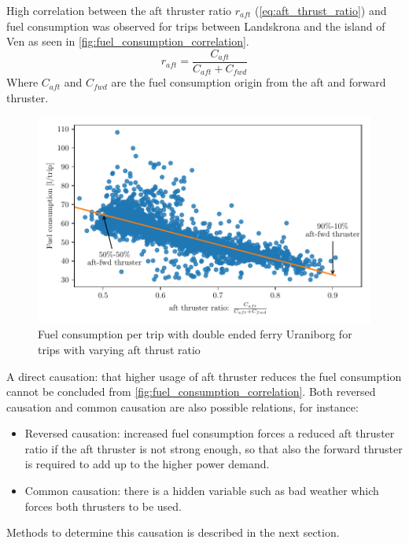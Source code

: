 \documentclass[fleqn,10pt]{olplainarticle}
\begin{document}
\newpage 
\noindent High correlation between the aft thruster ratio $r_{aft}$ (\autoref{eq:aft_thrust_ratio}) and fuel consumption 
was observed for trips between Landskrona and the island of Ven as seen in \autoref{fig:fuel_consumption_correlation}.
\begin{equation}
    r_{aft} = \frac{C_{aft}}{C_{aft} + C_{fwd}}
    \label{eq:aft_thrust_ratio}
\end{equation}
Where $C_{aft}$ and $C_{fwd}$ are the fuel consumption origin from the aft and forward thruster.
\begin{figure}[!htb]
    \centering
    \includegraphics[width=\textwidth]{figures/correlation.pdf}
    \caption{Fuel consumption per trip with double ended ferry Uraniborg for trips with varying aft thrust ratio}
    \label{fig:fuel_consumption_correlation}
\end{figure}

\noindent A direct causation: that higher usage of aft thruster reduces the fuel consumption cannot be concluded from \autoref{fig:fuel_consumption_correlation}. Both reversed causation and common causation are also possible relations, for instance:
\begin{itemize}
    \item Reversed causation: increased fuel consumption forces a reduced aft thruster ratio if the aft thruster is not strong enough, so that also the forward thruster is required to add up to the higher power demand.
    
    \item Common causation: there is a hidden variable such as bad weather which forces both thrusters to be used.
\end{itemize}
Methods to determine this causation is described in the next section. 
\end{document}
